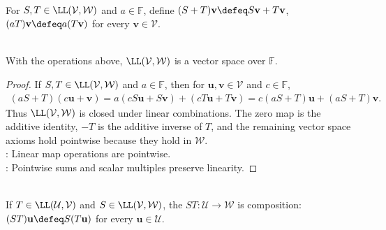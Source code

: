 \begin{definition} \\
For $S,T\in\LL(\mathcal{V},\mathcal{W})$ and $a\in\mathbb{F}$, define $(S+T)\mathbf{v}\defeq S\mathbf{v}+T\mathbf{v}$, $(aT)\mathbf{v}\defeq a(T\mathbf{v})$ for every $\mathbf{v}\in\mathcal{V}$.
\end{definition}

\begin{proposition} \label{prop:linear-maps-form-vector-space} \\
With the operations above, $\LL(\mathcal{V},\mathcal{W})$ is a vector space over $\mathbb{F}$.
\begin{proof}
If $S,T\in\LL(\mathcal{V},\mathcal{W})$ and $a\in\mathbb{F}$, then for $\mathbf{u},\mathbf{v}\in\mathcal{V}$ and $c\in\mathbb{F}$,
\begin{align}
(aS+T)(c\mathbf{u}+\mathbf{v})
=a(cS\mathbf{u}+S\mathbf{v})+(cT\mathbf{u}+T\mathbf{v})
=c(aS+T)\mathbf{u}+(aS+T)\mathbf{v}. \nonumber
\end{align}
Thus $\LL(\mathcal{V},\mathcal{W})$ is closed under linear combinations. The zero map is the additive identity, $-T$ is the additive inverse of $T$, and the remaining vector space axioms hold pointwise because they hold in $\mathcal{W}$.\\
: Linear map operations are pointwise.\\
: Pointwise sums and scalar multiples preserve linearity.
\end{proof}
\end{proposition}

\begin{definition} \\
If $T\in\LL(\mathcal{U},\mathcal{V})$ and $S\in\LL(\mathcal{V},\mathcal{W})$, the  $ST:\mathcal{U}\to\mathcal{W}$ is composition: $(ST)\mathbf{u}\defeq S(T\mathbf{u})$ for every $\mathbf{u}\in\mathcal{U}$.
\end{definition}

